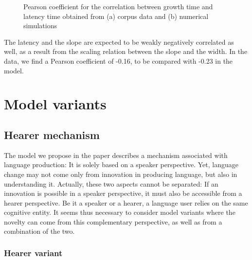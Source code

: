 \documentclass[12pt,twocolumn,amsmath,amssymb,aps,longbibliography]{revtex4-1}  %
\begin{document}
\begin{figure}[!tbp]
  \centering
  \hfill
  \caption{Pearson coefficient for the correlation between growth time and latency time obtained from (a) corpus data and (b) numerical simulations}
\end{figure}

The latency and the slope are expected to be weakly negatively correlated as well, as a result from the scaling relation between the slope and the width. In the data, we find a Pearson coefficient of -0.16, to be compared with -0.23 in the model.

\section{Model variants}

\subsection{Hearer mechanism \label{hearer_mech}}

The model we propose in the paper describes a mechanism associated with language production: It is solely based on a speaker perspective. Yet, language change may not come only from innovation in producing language, but also in understanding it. Actually, these two aspects cannot be separated: If an innovation is possible in a speaker perspective, it must also be accessible from a hearer perspective. Be it a speaker or a hearer, a language user relies on the same cognitive entity. It seems thus necessary to consider model variants where the novelty can come from this complementary perspective, as well as from a combination of the two.

\subsubsection{Hearer variant}
\end{document}
